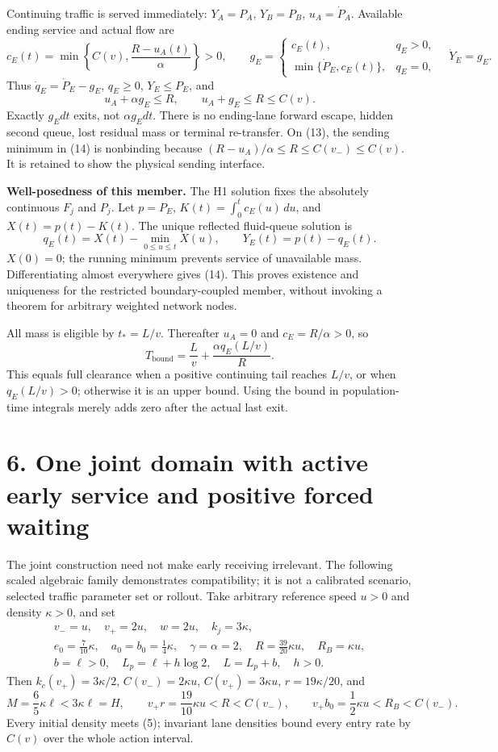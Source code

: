 \documentclass[11pt,a4paper]{article}
\begin{document}
Continuing traffic is served immediately:
$Y_A=P_A$, $Y_B=P_B$, $u_A=\dot P_A$.
Available ending service and actual flow are
\[
 c_E(t)=\min\left\{C(v),\frac{R-u_A(t)}{\alpha}\right\}>0,\qquad
 g_E=
 \begin{cases}
 c_E(t),&q_E>0,\\
 \min\{\dot P_E,c_E(t)\},&q_E=0 ,
 \end{cases}
 \quad \dot Y_E=g_E.
 \tag{14}
\]
Thus $\dot q_E=\dot P_E-g_E$, $q_E\geq0$, $Y_E\leq P_E$, and
\[
 u_A+\alpha g_E\leq R,\qquad
 u_A+g_E\leq R\leq C(v).
 \tag{15}
\]
Exactly $g_Edt$ exits, not $\alpha g_Edt$. There is no ending-lane forward
escape, hidden second queue, lost residual mass or terminal re-transfer.
On (13), the sending minimum in (14) is nonbinding because
$(R-u_A)/\alpha\leq R\leq C(v_-)\leq C(v)$.
It is retained to show the physical sending interface.

\textbf{Well-posedness of this member.}
The H1 solution fixes the absolutely continuous $F_j$ and $P_j$.
Let $p=P_E$, $K(t)=\int_0^t c_E(u)\,du$, and $X(t)=p(t)-K(t)$.
The unique reflected fluid-queue solution is
\[
 q_E(t)=X(t)-\min_{0\leq u\leq t}X(u),\qquad Y_E(t)=p(t)-q_E(t).
 \tag{16}
\]
$X(0)=0$; the running minimum prevents service of unavailable mass.
Differentiating almost everywhere gives (14). This proves existence and
uniqueness for the restricted boundary-coupled member, without invoking
a theorem for arbitrary weighted network nodes.

All mass is eligible by $t_*=L/v$. Thereafter $u_A=0$ and
$c_E=R/\alpha>0$, so
\[
 T_{\mathrm{bound}}=\frac Lv+\frac{\alpha q_E(L/v)}R.
 \tag{17}
\]
This equals full clearance when a positive continuing tail reaches $L/v$,
or when $q_E(L/v)>0$; otherwise it is an upper bound.
Using the bound in population-time integrals merely adds zero after
the actual last exit.

\section*{6. One joint domain with active early service and positive forced waiting}
The joint construction need not make early receiving irrelevant.
The following scaled algebraic family demonstrates compatibility; it
is not a calibrated scenario, selected traffic parameter set or rollout.
Take arbitrary reference speed $u>0$ and density $\kappa>0$, and set
\[
 \begin{gathered}
 v_-=u,\quad v_+=2u,\quad w=2u,\quad k_j=3\kappa,\\
 e_0=\frac7{10}\kappa,\quad a_0=b_0=\frac14\kappa,\quad
 \gamma=\alpha=2,\quad
 R=\frac{39}{20}\kappa u,\quad R_B=\kappa u,\\
 b=\ell>0,\quad L_p=\ell+h\log2,\quad L=L_p+b,\quad h>0.
 \end{gathered}
 \tag{18}
\]
Then $k_c(v_+)=3\kappa/2$, $C(v_-)=2\kappa u$,
$C(v_+)=3\kappa u$, $r=19\kappa/20$, and
\[
 M=\frac65\kappa\ell <3\kappa\ell=H,\qquad
 v_+r=\frac{19}{10}\kappa u<R<C(v_-),\qquad
 v_+b_0=\frac12\kappa u<R_B<C(v_-).
 \tag{19}
\]
Every initial density meets (5); invariant lane densities bound every entry
rate by $C(v)$ over the whole action interval.
\end{document}
